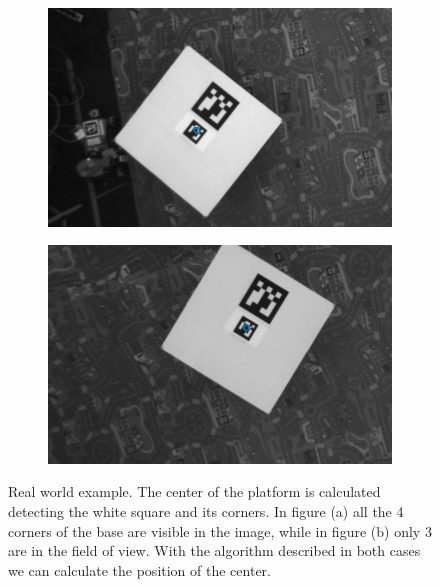 \begin{figure}[!htbp]
  \centering
   \begin{subfigure}[b]{0.45\textwidth}
        \includegraphics[width=\textwidth]{img/img_330.png}
        \label{fig:one_1}
        \caption{}
   \end{subfigure}\hfill
   \begin{subfigure}[b]{0.45\textwidth}
        \includegraphics[width=\textwidth]{img/img_155.png}
        \label{fig:two_1}
        \caption{}
   \end{subfigure}
  \caption{Real world example. The center of the platform is calculated detecting the white square and its corners. In figure (a) all the 4 corners of the base are visible in the image, while in figure (b) only 3 are in the field of view. With the algorithm described in both cases we can calculate the position of the center.}
  \label{fig:optical_folw_sequence2}
\end{figure} 

